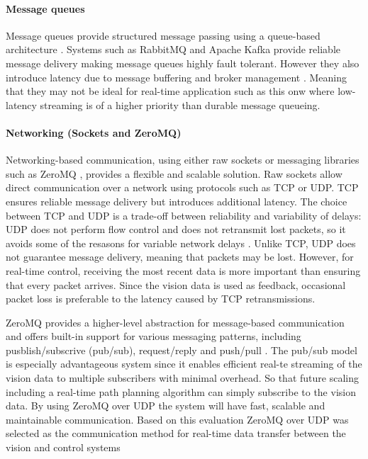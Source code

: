 \paragraph*{Message queues}
Message queues provide structured message passing using a queue-based architecture . Systems such as RabbitMQ and Apache Kafka provide reliable message delivery making message queues highly fault tolerant. However they also introduce latency due to message buffering and broker management . Meaning that they may not be ideal for real-time application such as this onw where low-latency streaming is of a higher priority than durable message queueing.

\paragraph*{Networking (Sockets and ZeroMQ)}
Networking-based communication, using either raw sockets or messaging libraries such as ZeroMQ , provides a flexible and scalable solution. Raw sockets allow direct communication over a network using protocols such as TCP or UDP. TCP ensures reliable message delivery but introduces additional latency. The choice between TCP and UDP is a trade-off between reliability and variability of delays: UDP does not perform flow control and does not retransmit lost packets, so it avoids some of the resasons for variable network delays \cite{kleppmann_designing_2017}. Unlike TCP, UDP does not guarantee message delivery, meaning that packets may be lost.  However, for real-time control, receiving the most recent data is more important than ensuring that every packet arrives. Since the vision data is used as feedback, occasional packet loss is preferable to the latency caused by TCP retransmissions. 

ZeroMQ provides a higher-level abstraction for message-based communication and offers built-in support for various messaging patterns, including pusblish/subscrive (pub/sub), request/reply and push/pull . The pub/sub model is especially advantageous system since it enables efficient real-te streaming of the vision data to multiple subscribers with minimal overhead. So that future scaling including a real-time path planning algorithm can simply subscribe to the vision data. By using ZeroMQ over UDP the system will have fast, scalable and maintainable communication. Based on this evaluation ZeroMQ over UDP was selected as the communication method for real-time data transfer between the vision and control systems

